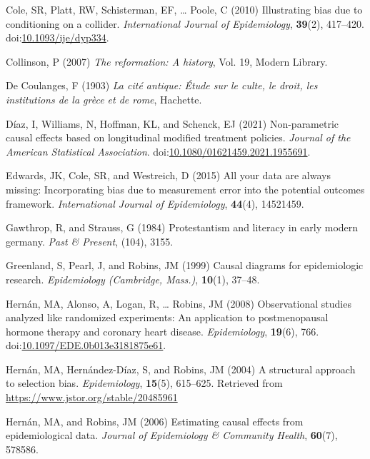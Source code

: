 \documentclass[
  singlecolumn,
  9pt]{article}
\begin{document}
\begin{CSLReferences}
Cole, SR, Platt, RW, Schisterman, EF, \ldots{} Poole, C (2010)
Illustrating bias due to conditioning on a collider. \emph{International
Journal of Epidemiology}, \textbf{39}(2), 417--420.
doi:\href{https://doi.org/10.1093/ije/dyp334}{10.1093/ije/dyp334}.

Collinson, P (2007) \emph{The reformation: A history}, Vol. 19, Modern
Library.

De Coulanges, F (1903) \emph{La cité antique: Étude sur le culte, le
droit, les institutions de la grèce et de rome}, Hachette.

Díaz, I, Williams, N, Hoffman, KL, and Schenck, EJ (2021) Non-parametric
causal effects based on longitudinal modified treatment policies.
\emph{Journal of the American Statistical Association}.
doi:\href{https://doi.org/10.1080/01621459.2021.1955691}{10.1080/01621459.2021.1955691}.

Edwards, JK, Cole, SR, and Westreich, D (2015) All your data are always
missing: Incorporating bias due to measurement error into the potential
outcomes framework. \emph{International Journal of Epidemiology},
\textbf{44}(4), 14521459.

Gawthrop, R, and Strauss, G (1984) Protestantism and literacy in early
modern germany. \emph{Past \& Present}, (104), 3155.

Greenland, S, Pearl, J, and Robins, JM (1999) Causal diagrams for
epidemiologic research. \emph{Epidemiology (Cambridge, Mass.)},
\textbf{10}(1), 37--48.

Hernán, MA, Alonso, A, Logan, R, \ldots{} Robins, JM (2008)
Observational studies analyzed like randomized experiments: An
application to postmenopausal hormone therapy and coronary heart
disease. \emph{Epidemiology}, \textbf{19}(6), 766.
doi:\href{https://doi.org/10.1097/EDE.0b013e3181875e61}{10.1097/EDE.0b013e3181875e61}.

Hernán, MA, Hernández-Díaz, S, and Robins, JM (2004) A structural
approach to selection bias. \emph{Epidemiology}, \textbf{15}(5),
615--625. Retrieved from \url{https://www.jstor.org/stable/20485961}

Hernán, MA, and Robins, JM (2006) Estimating causal effects from
epidemiological data. \emph{Journal of Epidemiology \& Community
Health}, \textbf{60}(7), 578586.


\end{CSLReferences}
\end{document}
